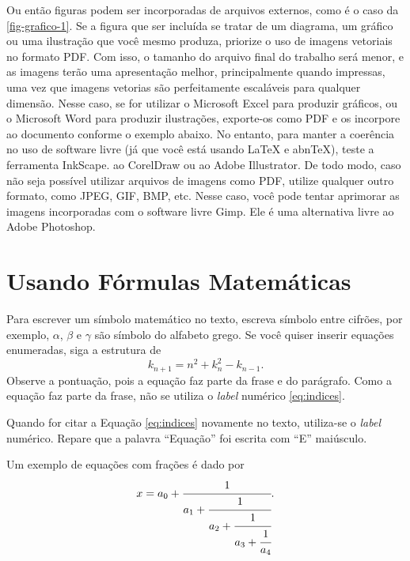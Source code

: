     Ou então figuras podem ser incorporadas de arquivos externos, como é o caso da \autoref{fig-grafico-1}. Se a figura que ser incluída se tratar de um diagrama, um gráfico ou uma ilustração que você mesmo produza, priorize o uso de imagens vetoriais no formato PDF. Com isso, o tamanho do arquivo final do trabalho será menor, e as imagens terão uma apresentação melhor, principalmente quando impressas, uma vez que imagens vetorias são perfeitamente escaláveis para qualquer dimensão. Nesse caso, se for utilizar o Microsoft Excel para produzir gráficos, ou o Microsoft Word para produzir ilustrações, exporte-os como PDF e os incorpore ao documento conforme o exemplo abaixo. No entanto, para manter a coerência no uso de software livre (já que você está usando LaTeX e abnTeX),  teste a ferramenta InkScape. ao CorelDraw ou ao Adobe Illustrator.  De todo modo, caso não seja possível  utilizar arquivos de imagens como PDF, utilize qualquer outro formato, como JPEG, GIF, BMP, etc.  Nesse caso, você pode tentar aprimorar as imagens incorporadas com o software livre Gimp. Ele é uma alternativa livre ao Adobe Photoshop.

\section{Usando Fórmulas Matemáticas}

Para escrever um símbolo matemático no texto, escreva símbolo entre cifrões, por exemplo, $\alpha$, $\beta$ e $\gamma$ são símbolo do alfabeto grego. Se você quiser inserir equações enumeradas, siga a estrutura de
\begin{equation}
    \label{eq:indices}
	k_{n+1} = n^2 + k_n^2 - k_{n-1}.
\end{equation}
Observe a pontuação, pois a equação faz parte da frase e do parágrafo. Como a equação faz parte da frase, não se utiliza o \textit{label} numérico \ref{eq:indices}. 

Quando for citar a Equação \ref{eq:indices} novamente no texto, utiliza-se o \textit{label} numérico. Repare que a palavra ``Equação'' foi escrita com ``E'' maiúsculo. 

Um exemplo de equações com frações é dado por
\begin{equation}
	\label{eq:fracao}
		\begin{aligned}
			x = a_0 + \cfrac{1}{a_1
				+ \cfrac{1}{a_2
					+ \cfrac{1}{a_3 + \cfrac{1}{a_4} } } }.
		\end{aligned}
	\end{equation}

